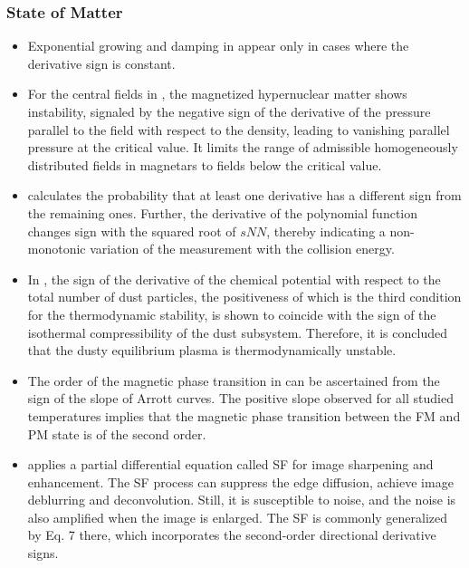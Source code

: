 \documentclass[11pt]{book}
\begin{document}
\subsubsection{State of Matter}
\begin{itemize}
\item Exponential growing and damping in \cite{soshnikov2007collisionless}
appear only in cases where the derivative sign is constant.
\item For the central fields in \cite{sinha2013hypernuclear},
the magnetized hypernuclear matter shows instability, signaled by
the negative sign of the derivative of the pressure parallel to the
field with respect to the density, leading to vanishing parallel pressure
at the critical value. It limits the range of admissible homogeneously
distributed fields in magnetars to fields below the critical value.
\item \cite{adam2020net}
calculates the probability that at least one derivative has a different
sign from the remaining ones. Further, the derivative of the polynomial
function changes sign with the squared root of $sNN$, thereby indicating
a non-monotonic variation of the measurement with the collision energy.
\item In \cite{filippov2020electrostatic},
the sign of the derivative of the chemical potential with respect
to the total number of dust particles, the positiveness of which is
the third condition for the thermodynamic stability, is shown to coincide
with the sign of the isothermal compressibility of the dust subsystem.
Therefore, it is concluded that the dusty equilibrium plasma is thermodynamically
unstable.
\item The order of the magnetic phase transition in \cite{jeddi2020improvement}
can be ascertained from the sign of the slope of Arrott curves. The
positive slope observed for all studied temperatures implies that
the magnetic phase transition between the FM and PM state is of the
second order.
\item \cite{correyero2020physics}
applies a partial differential equation called SF for image sharpening
and enhancement. The SF process can suppress the edge diffusion, achieve
image deblurring and deconvolution. Still, it is susceptible to noise,
and the noise is also amplified when the image is enlarged. The SF
is commonly generalized by Eq. 7 there, which incorporates the second-order
directional derivative signs.
\end{itemize}
\end{document}
